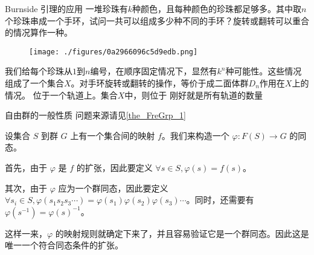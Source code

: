 \begin{example}{Burnside 引理的应用}
一堆珍珠有$k$种颜色，且每种颜色的珍珠都足够多。其中取$n$个珍珠串成一个手环，试问一共可以组成多少种不同的手环？旋转或翻转可以重合的情况算作一种。

\begin{figure}[ht]
\centering
\texttt{[image: ./figures/0a2966096c5d9edb.png]}
\caption{} \label{fig_GroupP_1}
\end{figure}

我们给每个珍珠从$1$到$n$编号，在顺序固定情况下，显然有$k^n$种可能性。这些情况组成了一个集合$X$。对手环旋转或翻转的操作，等价于成二面体群$D_n$作用在$X$上的情况。
位于一个轨道上。集合$X$中，则位于
刚好就是所有轨道的数量
 
\end{example}




\begin{example}{自由群的一般性质}\label{ex_GroupP_4}
问题来源请见\autoref{the_FreGrp_1}~

设集合 $S$ 到群 $G$ 上有一个集合间的映射 $f$。我们来构造一个 $\varphi: F(S)\rightarrow G$ 的同态。

首先，由于 $\varphi$ 是 $f$ 的扩张，因此要定义 $\forall s\in S, \varphi(s)=f(s)$。

其次，由于 $\varphi$ 应为一个群同态，因此要定义 $\forall s_i\in S, \varphi({s_1s_2s_3\cdots})=\varphi(s_1)\varphi(s_2)\varphi(s_3)\cdots$。同时，还需要有 $\varphi(s^{-1})=\varphi(s)^{-1}$。

这样一来，$\varphi$ 的映射规则就确定下来了，并且容易验证它是一个群同态。因此这是唯一一个符合同态条件的扩张。


\end{example}


